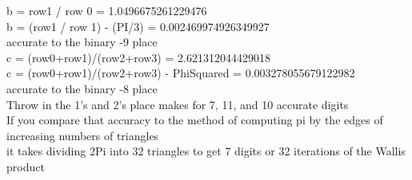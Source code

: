 \documentclass[11pt]{article}
\begin{document}
\noindent b = row1 / row 0 = 1.0496675261229476\\
b = (row1 / row 1) - (PI/3) = 0.002469974926349927\\
accurate to the binary -9 place\\

\noindent c = (row0+row1)/(row2+row3) = 2.621312044429018\\
c = (row0+row1)/(row2+row3) - PhiSquared = 0.003278055679122982\\
accurate to the binary -8 place\\

\noindent Throw in the 1's and 2's place makes for 7, 11, and 10 accurate digits\\
If you compare that accuracy to the method of computing pi by the edges of increasing numbers of triangles\\
it takes dividing 2Pi into 32 triangles to get 7 digits or 32 iterations of the Wallis product\\



\end{document}
